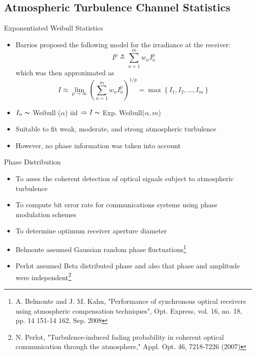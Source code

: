 \documentclass[aspectratio=169]{beamer}
\begin{document}
\subsection{Atmospheric Turbulence Channel Statistics}
\begin{frame}{Exponentiated Weibull Statistics}
    \begin{itemize}
        \item Barrios proposed the following model for the irradiance at the receiver:
            \begin{equation*}
                I^p \triangleq \sum_{n=1}^{m}w_nI_n^p
            \end{equation*}
            which was then approximated as
            \begin{equation*}
                I \approx \lim_{p\to \infty}\left(\sum_{n=1}^{m}w_nI_n^p\right)^{1/p} = \max \left\{I_1, I_2, ..., I_m\right\}
            \end{equation*}
        \item $I_n \thicksim$ Weibull ($\alpha$) iid $\Rightarrow I \thicksim$ Exp. Weibull($\alpha, m$)
        \item Suitable to fit weak, moderate, and strong atmospheric turbulence
        \item However, no phase information was taken into account
    \end{itemize}
\end{frame}

\begin{frame}{Phase Distribution}
    \begin{itemize}
        \item To asses the coherent detection of optical signals subject to atmospheric turbulence
        \item To compute bit error rate for communications systems using phase modulation schemes
        \item To determine optimum receiver aperture diameter
        \item Belmonte assumed Gaussian random phase fluctuations\footnote{A. Belmonte and J. M. Kahn, "Performance of synchronous optical receivers using atmospheric compensation techniques", Opt. Express, vol. 16, no. 18, pp. 14 151-14 162, Sep. 2008}
        \item Perlot assumed Beta distributed phase and also that phase and amplitude were independent\footnote{N. Perlot, "Turbulence-induced fading probability in coherent optical communication through the atmosphere," Appl. Opt. 46, 7218-7226 (2007)}
     \end{itemize}
\end{frame}
\end{document}
